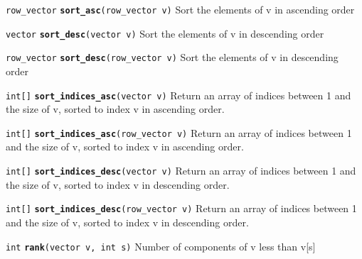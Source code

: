\documentclass[
  10pt,
]{book}
\begin{document}
\texttt{row\_vector} \textbf{\texttt{sort\_asc}}\texttt{(row\_vector\ v)}\newline
Sort the elements of v in ascending order


\texttt{vector} \textbf{\texttt{sort\_desc}}\texttt{(vector\ v)}\newline
Sort the elements of v in descending order


\texttt{row\_vector} \textbf{\texttt{sort\_desc}}\texttt{(row\_vector\ v)}\newline
Sort the elements of v in descending order


\texttt{int{[}{]}} \textbf{\texttt{sort\_indices\_asc}}\texttt{(vector\ v)}\newline
Return an array of indices between 1 and the size of v, sorted to
index v in ascending order.


\texttt{int{[}{]}} \textbf{\texttt{sort\_indices\_asc}}\texttt{(row\_vector\ v)}\newline
Return an array of indices between 1 and the size of v, sorted to
index v in ascending order.


\texttt{int{[}{]}} \textbf{\texttt{sort\_indices\_desc}}\texttt{(vector\ v)}\newline
Return an array of indices between 1 and the size of v, sorted to
index v in descending order.


\texttt{int{[}{]}} \textbf{\texttt{sort\_indices\_desc}}\texttt{(row\_vector\ v)}\newline
Return an array of indices between 1 and the size of v, sorted to
index v in descending order.


\texttt{int} \textbf{\texttt{rank}}\texttt{(vector\ v,\ int\ s)}\newline
Number of components of v less than v{[}s{]}
\end{document}
